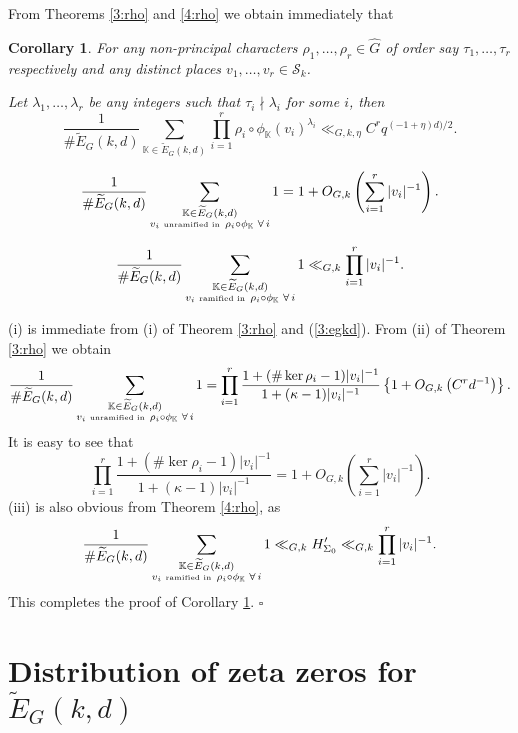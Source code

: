 \documentclass[12pt]{amsart}
\theoremstyle{plain}
\newtheorem{cor}{Corollary}
\begin{document}
From Theorems \ref{3:rho} and \ref{4:rho} we obtain immediately that
\begin{cor} \label{5:rho} For any non-principal characters $\rho_1,\ldots,\rho_r \in \widehat{G}$ of order say $\tau_1,\ldots,\tau_r$ respectively and any distinct places $v_1,\ldots,v_r \in {\mathcal{S}_k}$.

 Let  $\lambda_1,\ldots,\lambda_r$ be any integers such that $\tau_i \nmid \lambda_i$ for some $i$, then
\[ \frac{1}{\#\widetilde{E}_G(k,d) } \sum_{{{\mathbb K}} \in \widetilde{E}_G(k,d) } \prod_{i=1}^r \rho_i \circ {\phi_{{\mathbb K}}}\left(v_i\right)^{\lambda_i} \ll_{G,k,\eta} C^r q^{(-1+\eta)d)/{2}} .\]

\[\frac{1}{\#\widetilde{E}_G(k,d)}\sum_{\substack{{{\mathbb K}} \in \widetilde{E}_G(k,d)\\
v_i \,\,\mbox{\tiny unramified in } \, \rho_i \circ {\phi_{{\mathbb K}}} \,\, \forall \, i}}1= 1+O_{G,k}\left(\sum_{i=1}^r|v_i|^{-1}\right) . \]

\[\frac{1}{\#\widetilde{E}_G(k,d)} \sum_{\substack{{{\mathbb K}} \in \widetilde{E}_G(k,d)\\
v_i \,\,\mbox{\tiny ramified in } \, \rho_i \circ {\phi_{{\mathbb K}}} \,\, \forall \, i}}1 \ll_{G,k} \prod_{i=1}^r |v_i|^{-1}. \]
\end{cor}

 (i) is immediate from (i) of Theorem \ref{3:rho} and (\ref{3:egkd}). From (ii) of Theorem \ref{3:rho} we obtain
\[\frac{1}{\#\widetilde{E}_G(k,d)}\sum_{\substack{{{\mathbb K}} \in \widetilde{E}_G(k,d)\\
v_i \,\,\mbox{\tiny unramified in } \, \rho_i \circ {\phi_{{\mathbb K}}} \,\, \forall \, i}}1= \prod_{i=1}^r \frac{1+(\#\ker \rho_i-1)|v_i|^{-1}}{
1+(\kappa-1)|v_i|^{-1}} \left\{1+O_{G,k}\left(C^r d^{-1}\right)\right\}. \]
It is easy to see that
\[\prod_{i=1}^r \frac{1+(\#\ker \rho_i-1)|v_i|^{-1}}{
1+(\kappa-1)|v_i|^{-1}} =1+O_{G,k}\left(\sum_{i=1}^r|v_i|^{-1}\right).\]
(iii) is also obvious from Theorem \ref{4:rho}, as
\[\frac{1}{\#\widetilde{E}_G(k,d)} \sum_{\substack{{{\mathbb K}} \in \widetilde{E}_G(k,d)\\
v_i \,\,\mbox{\tiny ramified in } \, \rho_i \circ {\phi_{{\mathbb K}}} \,\, \forall \, i}}1 \ll_{G,k}H_{\Sigma_0}' \ll_{G,k} \prod_{i=1}^r |v_i|^{-1}.\]
This completes the proof of Corollary \ref{5:rho}. \quad $\square$

\section{Distribution of zeta zeros for $\widetilde{E}_G(k,d)$}
\end{document}
